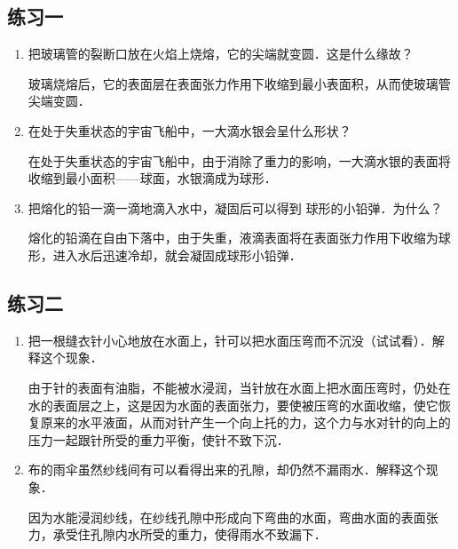 \subsection{练习一}
\begin{enumerate}
    \item 把玻璃管的裂断口放在火焰上烧熔，它的尖端就变圆．这是什么缘故？

\begin{solution}
    玻璃烧熔后，它的表面层在表面张力作用下收缩到最小表面积，从而使玻璃管尖端变圆．    
\end{solution}
\item 在处于失重状态的宇宙飞船中，一大滴水银会呈什么形状？

\begin{solution}
    在处于失重状态的宇宙飞船中，由于消除了重力的影响，一大滴水银的表面将收缩到最小面积——球面，水银滴成为球形．    
\end{solution}
\item 把熔化的铅一滴一滴地滴入水中，凝固后可以得到
球形的小铅弹．为什么？

\begin{solution}
    熔化的铅滴在自由下落中，由于失重，液滴表面将在表面张力作用下收缩为球形，进入水后迅速冷却，就会凝固成球形小铅弹．
\end{solution}
\end{enumerate}

\subsection{练习二}

\begin{enumerate}
   \item 把一根缝衣针小心地放在水面上，针可以把水面压弯而不沉没（试试看）．解释这个现象．

   \begin{solution}
 由于针的表面有油脂，不能被水浸润，当针放在水面上把水面压弯时，仍处在水的表面层之上，这是因为水面的表面张力，要使被压弯的水面收缩，使它恢复原来的水平液面，从而对针产生一个向上托的力，这个力与水对针的向上的压力一起跟针所受的重力平衡，使针不致下沉．  
   \end{solution}
   \item 布的雨伞虽然纱线间有可以看得出来的孔隙，却仍然不漏雨水．解释这个现象．

   \begin{solution}
    因为水能浸润纱线，在纱线孔隙中形成向下弯曲的水面，弯曲水面的表面张力，承受住孔隙内水所受的重力，使得雨水不致漏下．
   \end{solution}
\end{enumerate}




